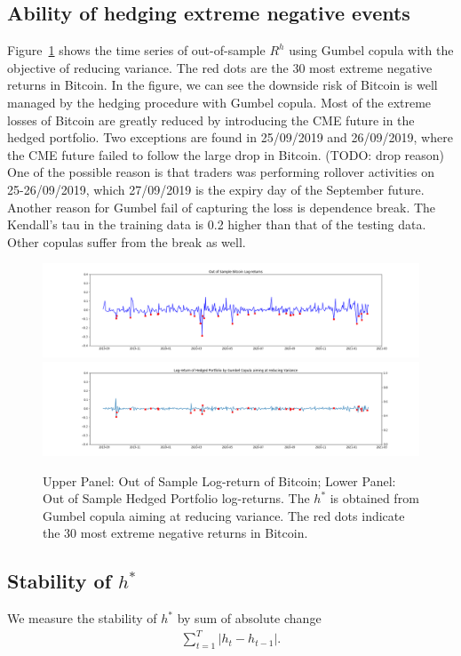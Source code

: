 \subsection{Ability of hedging extreme negative events}
Figure~\ref{fig:Gumbel} shows the time series of out-of-sample $R^h$ using Gumbel copula with the
objective of reducing variance.
The red dots are the 30 most extreme negative returns in Bitcoin.
In the figure, we can see the downside risk of Bitcoin is well managed by the hedging procedure with Gumbel copula.
Most of the extreme losses of Bitcoin are greatly reduced by introducing the CME future in the hedged portfolio.
Two exceptions are found in 25/09/2019 and 26/09/2019, where the CME future failed to follow the large drop in Bitcoin. (TODO: drop reason)
One of the possible reason is that traders was performing rollover activities on 25-26/09/2019, which
27/09/2019 is the expiry day of the September future.
Another reason for Gumbel fail of capturing the loss is dependence break.
The Kendall's tau in the training data is 0.2 higher than that of the testing data.
Other copulas suffer from the break as well.

\begin{figure}[!th]
   \centering
   \includegraphics[width=\textwidth]{_pics/OOSBitcoin.png}
   \includegraphics[width=\textwidth]{_pics/Gumbel_rh.png}
   \caption{Upper Panel: Out of Sample Log-return of Bitcoin; Lower Panel: Out of Sample Hedged Portfolio log-returns.
   The $h^*$ is obtained from Gumbel copula aiming at reducing variance.
   The red dots indicate the 30 most extreme negative returns in Bitcoin.
   }
   \label{fig:Gumbel}
\end{figure}

\subsection{Stability of $h^*$}
We measure the stability of $h^*$ by sum of absolute change
\begin{align}
    \sum_{t=1}^T|h_t - h_{t-1}|.
    \end{align}

